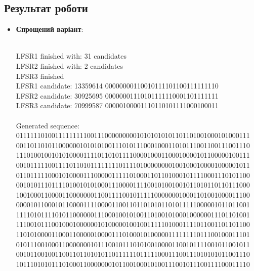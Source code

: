 \documentclass[12pt]{article}
\begin{document}
\subsection{Результат роботи}
\begin{itemize}
    \item \textbf{Спрощений варіант}:
        \begin{tcolorbox}
        \\
LFSR1 finished with: 31 candidates \\
LFSR2 finished with: 2 candidates \\
LFSR3 finished \\

LFSR1 candidate:   13359614 00000000110010111101100111111110 \\ 
LFSR2 candidate:   30925695 00000001110101111110001101111111 \\
LFSR3 candidate:   70999587 00000100001110110101111000100011 \\ 
\\
Generated sequence: \\
011111101001111111110011100000000010101010101101101001000101000111 \\
001101101011000000101010100111010111000100011010111001100111001110 \\
111010010010101000011110110101111000010001100010000101100000100111 \\
001011111001111011010111111110111101000000001001000100001000001011 \\
011011111000101000011100000111110100011011010001011110001110101100 \\
001010111011110100101010001110000111100101001001011010110110111000 \\
100100011000011000000011001111001011111000000010001101001000011100 \\
000010110001011000011110000110011011010101101011111000001011011001 \\
111101011110101100000011100010010100110100101000100000011101101001 \\
111001011100100010000001010000010010011111010001111011001101101100 \\
110101000011000110000010000111010001010000011111111011100100011101 \\
010111001000110000000101110010111010100100001100101111001011001011 \\
001011001001100110110101011011111101111100011100111010101011001110 \\
101110101011101000110000000101100100010100111001011100111100011110 \\

\end{tcolorbox}
\end{itemize}
\end{document}
